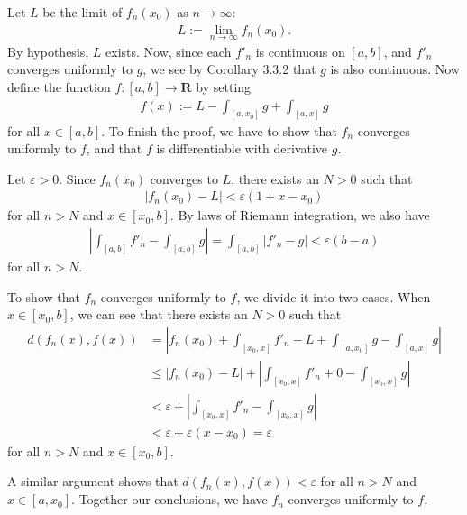 \documentclass{book}
\begin{document}
Let $L$ be the limit of $f_n(x_0)$ as $n \to \infty$:
    \begin{align*}
        L := \lim_{n \to \infty} f_n(x_0).
    \end{align*}
By hypothesis, $L$ exists. Now, since each $f'_n$ is continuous on $[a, b]$, and $f'_n$ converges uniformly to $g$, we see by Corollary 3.3.2 that $g$ is also continuous. Now define the function $f : [a, b] \to \mathbf{R}$ by setting
    \begin{align*}
        f(x) := L - \int_{[a, x_0]} g + \int_{[a, x]} g
    \end{align*}
for all $x \in [a, b]$. To finish the proof, we have to show that $f_n$ converges uniformly to $f$, and that $f$ is differentiable with derivative $g$.

Let $\varepsilon > 0$. Since $f_n(x_0)$ converges to $L$, there exists an $N > 0$ such that
    \begin{align*}
        |f_n(x_0) - L| < \varepsilon(1 + x - x_0)
    \end{align*}
for all $n > N$ and $x \in [x_0, b]$. By laws of Riemann integration, we also have
    \begin{align*}
        \left| \int_{[a, b]} f'_n - \int_{[a, b]} g \right|
        = \int_{[a, b]} |f'_n - g| < \varepsilon(b - a)
    \end{align*}
for all $n > N$.

To show that $f_n$ converges uniformly to $f$, we divide it into two cases. When $x \in [x_0, b]$, we can see that there exists an $N > 0$ such that
    \begin{align*}
        d(f_n(x), f(x))
        &= \left| f_n(x_0) + \int_{[x_0, x]} f'_n - L + \int_{[a, x_0]} g - \int_{[a, x]} g \right|\\
        &\leq |f_n(x_0) - L| + \left| \int_{[x_0, x]} f'_n + 0 - \int_{[x_0, x]} g \right|\\
        &< \varepsilon + \left| \int_{[x_0, x]} f'_n - \int_{[x_0, x]} g \right|\\
        &< \varepsilon + \varepsilon(x - x_0) = \varepsilon
    \end{align*}
for all $n > N$ and $x \in [x_0, b]$.

A similar argument shows that $d(f_n(x), f(x)) < \varepsilon$ for all $n > N$ and $x \in [a, x_0]$. Together our conclusions, we have $f_n$ converges uniformly to $f$.
\end{document}
